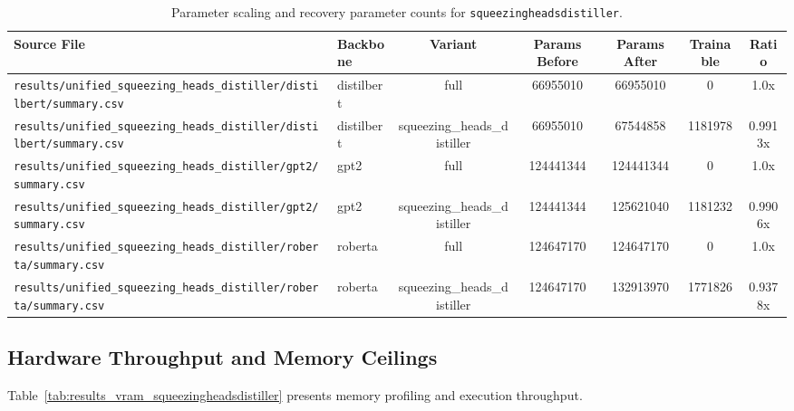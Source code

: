 \begin{table}[t]
\centering
\small
\begin{tabular}{llccccc}
\toprule
\textbf{Source File} & \textbf{Backbone} & \textbf{Variant} & \textbf{Params Before} & \textbf{Params After} & \textbf{Trainable} & \textbf{Ratio} \\
\midrule
\texttt{results/unified\_squeezing\_heads\_distiller/distilbert/summary.csv} & distilbert & full & 66955010 & 66955010 & 0 & 1.0x \\
\texttt{results/unified\_squeezing\_heads\_distiller/distilbert/summary.csv} & distilbert & squeezing\_heads\_distiller & 66955010 & 67544858 & 1181978 & 0.9913x \\
\texttt{results/unified\_squeezing\_heads\_distiller/gpt2/summary.csv} & gpt2 & full & 124441344 & 124441344 & 0 & 1.0x \\
\texttt{results/unified\_squeezing\_heads\_distiller/gpt2/summary.csv} & gpt2 & squeezing\_heads\_distiller & 124441344 & 125621040 & 1181232 & 0.9906x \\
\texttt{results/unified\_squeezing\_heads\_distiller/roberta/summary.csv} & roberta & full & 124647170 & 124647170 & 0 & 1.0x \\
\texttt{results/unified\_squeezing\_heads\_distiller/roberta/summary.csv} & roberta & squeezing\_heads\_distiller & 124647170 & 132913970 & 1771826 & 0.9378x \\
\bottomrule
\end{tabular}
\caption{Parameter scaling and recovery parameter counts for \texttt{squeezingheadsdistiller}.}
\label{tab:results_params_squeezingheadsdistiller}
\end{table}

\subsection{Hardware Throughput and Memory Ceilings}
Table~\ref{tab:results_vram_squeezingheadsdistiller} presents memory profiling and execution throughput.

